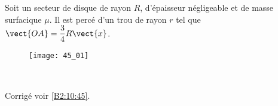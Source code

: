\normaltrue \difficilefalse \tdifficilefalse
\correctionfalse


\setcounter{question}{0}
\ifcorrection
\else
{}
\fi




\ifprof
\else
Soit un secteur de disque de rayon $R$, d'épaisseur négligeable et de masse surfacique $\mu$. Il est percé d'un trou de rayon $r$ tel que $\vect{OA}=\dfrac{3}{4}R\vect{x}$.
\begin{figure}[H]
\centering
\texttt{[image: 45\_01]}
\end{figure}
\fi


\ifprof
\else
\fi

\ifprof ~\\
\else
\fi


\ifprof
\else
\begin{flushright}
\footnotesize{Corrigé voir \ref{B2:10:45}.}
\end{flushright}%
\fi